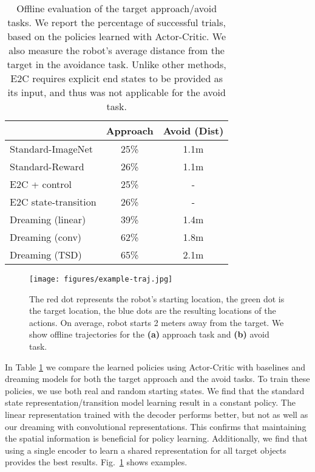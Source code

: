 \documentclass[letterpaper, 10 pt, conference]{ieeeconf}
\begin{document}
\begin{table}
\small
  \caption{Offline evaluation of the target approach/avoid tasks. We report the percentage of successful trials, based on the policies learned with Actor-Critic. We also measure the robot's average distance from the target in the avoidance task. Unlike other methods, E2C requires explicit end states to be provided as its input, and thus was not applicable for the avoid task.}
  \label{tab:off-compare}
  \centering
  \begin{tabular}{lcc}
    \toprule
         &  Approach & Avoid (Dist) \\
    \midrule
     Standard-ImageNet  & 25\% & 1.1m \\
     Standard-Reward  & 26\%  & 1.1m \\
     E2C + control \cite{watter2015embed} & 25\% & - \\
     E2C state-transition & 26\% & - \\
     Dreaming (linear) & 39\% & 1.4m \\
     Dreaming (conv) & 62\% & 1.8m\\
     Dreaming (TSD)  & 65\% & 2.1m\\
    \bottomrule
  \end{tabular}
\end{table}

\begin{figure}
    \centering
      \texttt{[image: figures/example-traj.jpg]}
    \caption{The red dot represents the robot's starting location, the green dot is the target location, the blue dots are the resulting locations of the actions. On average, robot starts 2 meters away from the target. We show offline trajectories for the \textbf{(a)} approach task and \textbf{(b)} avoid task.}
    \label{fig:ex-traj}
\end{figure}

In Table \ref{tab:off-compare} we compare the learned policies using Actor-Critic with baselines and dreaming models for both the target approach and the avoid tasks. To train these policies, we use both real and random starting states. We find that the standard state representation/transition model learning result in a constant policy. The linear representation trained with the decoder performs better, but not as well as our dreaming with convolutional representations. This confirms that maintaining the spatial information is beneficial for policy learning. Additionally, we find that using a single encoder to learn a shared representation for all target objects provides the best results. Fig.~\ref{fig:ex-traj} shows examples.
\end{document}
